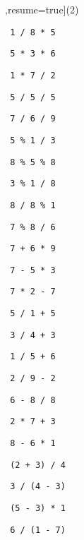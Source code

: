 \begin{exercise}
 

\begin{sltasks}[counter-format=1.tsk[1],resume=true](2)
    \task
    \begin{items}
        \item \texttt{ 1 / 8 * 5 }
        \item \texttt{ 5 * 3 * 6 }
        \item \texttt{ 1 * 7 / 2 }
        \item \texttt{ 5 / 5 / 5 }
        \item \texttt{ 7 / 6 / 9 }
    \end{items}
    \task
    \begin{items}
        \item \texttt{ 5 \% 1 / 3 }
        \item \texttt{ 8 \% 5 \% 8 }
        \item \texttt{ 3 \% 1 / 8 }
        \item \texttt{ 8 / 8 \% 1 }
        \item \texttt{ 7 \% 8 / 6 }
    \end{items}
    \task
    \begin{items}
        \item \texttt{ 7 + 6 * 9 }
        \item \texttt{ 7 - 5 * 3 }
        \item \texttt{ 7 * 2 - 7 }
        \item \texttt{ 5 / 1 + 5 }
        \item \texttt{ 3 / 4 + 3 }
    \end{items}
    \task
    \begin{items}
        \item \texttt{ 1 / 5 + 6 }
        \item \texttt{ 2 / 9 - 2 }
        \item \texttt{ 6 - 8 / 8 }
        \item \texttt{ 2 * 7 + 3 }
        \item \texttt{ 8 - 6 * 1 }
    \end{items}
    \task
    \begin{items}
        \item \texttt{ (2 + 3) / 4 }
        \item \texttt{ 3 / (4 - 3) }
        \item \texttt{ (5 - 3) * 1 }
        \item \texttt{ 6 / (1 - 7) }

\end{items}
\end{sltasks}
\end{exercise}
